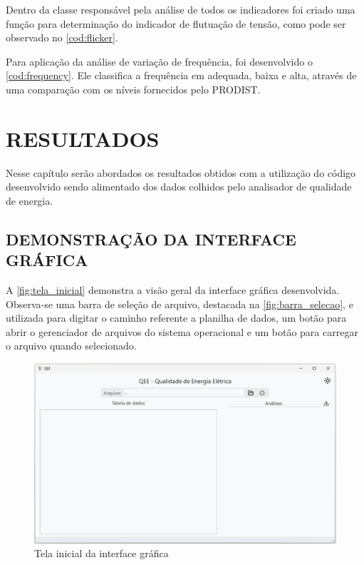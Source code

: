 Dentro da classe responsável pela análise de todos os indicadores foi criado uma função para determinação do indicador de flutuação de tensão, como pode ser observado no \autoref{cod:flicker}.

\begin{codigo}
\end{codigo}


Para aplicação da análise de variação de frequência, foi desenvolvido o \autoref{cod:frequency}. Ele classifica a frequência em adequada, baixa e alta, através de uma comparação com os níveis fornecidos pelo PRODIST.

\begin{codigo}
\end{codigo}

\chapter{RESULTADOS}

Nesse capítulo serão abordados os resultados obtidos com a utilização do código desenvolvido sendo alimentado dos dados colhidos pelo analisador de qualidade de energia.

\section{DEMONSTRAÇÃO DA INTERFACE GRÁFICA}

A \autoref{fig:tela_inicial} demonstra a visão geral da interface gráfica desenvolvida. Observa-se uma barra de seleção de arquivo, destacada na \autoref{fig:barra_selecao}, e utilizada para digitar o caminho referente a planilha de dados, um botão para abrir o gerenciador de arquivos do sistema operacional e um botão para carregar o arquivo quando selecionado.

\begin{figure}[H]
	\centering
	\caption{Tela inicial da interface gráfica}
	\label{fig:tela_inicial}
	\includegraphics[width=15cm]{illustrations/figures/tela_inicial.png}
\end{figure}

